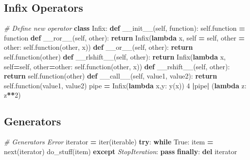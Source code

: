 \documentclass[]{book}
\newenvironment{Shaded}{\begin{snugshade}}{\end{snugshade}}
\newcommand{\KeywordTok}[1]{\textcolor[rgb]{0.13,0.29,0.53}{\textbf{#1}}}
\newcommand{\DecValTok}[1]{\textcolor[rgb]{0.00,0.00,0.81}{#1}}
\newcommand{\CommentTok}[1]{\textcolor[rgb]{0.56,0.35,0.01}{\textit{#1}}}
\newcommand{\FunctionTok}[1]{\textcolor[rgb]{0.00,0.00,0.00}{#1}}
\newcommand{\VariableTok}[1]{\textcolor[rgb]{0.00,0.00,0.00}{#1}}
\newcommand{\ControlFlowTok}[1]{\textcolor[rgb]{0.13,0.29,0.53}{\textbf{#1}}}
\newcommand{\OperatorTok}[1]{\textcolor[rgb]{0.81,0.36,0.00}{\textbf{#1}}}
\newcommand{\BuiltInTok}[1]{#1}
\newcommand{\PreprocessorTok}[1]{\textcolor[rgb]{0.56,0.35,0.01}{\textit{#1}}}
\newcommand{\NormalTok}[1]{#1}
\theoremstyle{definition}
\theoremstyle{definition}
\theoremstyle{definition}
\theoremstyle{remark}
\begin{document}
\subsection{Infix Operators}\label{infix-operators}

\begin{Shaded}
\begin{Highlighting}[]
\CommentTok{# Define new operator}
\KeywordTok{class}\NormalTok{ Infix:}
    \KeywordTok{def} \FunctionTok{__init__}\NormalTok{(}\VariableTok{self}\NormalTok{, function):}
        \VariableTok{self}\NormalTok{.function }\OperatorTok{=}\NormalTok{ function}
    \KeywordTok{def} \FunctionTok{__ror__}\NormalTok{(}\VariableTok{self}\NormalTok{, other):}
        \ControlFlowTok{return}\NormalTok{ Infix(}\KeywordTok{lambda}\NormalTok{ x, }\VariableTok{self} \OperatorTok{=} \VariableTok{self}\NormalTok{, other }\OperatorTok{=}\NormalTok{ other: }\VariableTok{self}\NormalTok{.function(other, x))}
    \KeywordTok{def} \FunctionTok{__or__}\NormalTok{(}\VariableTok{self}\NormalTok{, other):}
        \ControlFlowTok{return} \VariableTok{self}\NormalTok{.function(other)}
    \KeywordTok{def} \FunctionTok{__rlshift__}\NormalTok{(}\VariableTok{self}\NormalTok{, other):}
        \ControlFlowTok{return}\NormalTok{ Infix(}\KeywordTok{lambda}\NormalTok{ x, }\VariableTok{self}\OperatorTok{=}\VariableTok{self}\NormalTok{, other}\OperatorTok{=}\NormalTok{other: }\VariableTok{self}\NormalTok{.function(other, x))}
    \KeywordTok{def} \FunctionTok{__rshift__}\NormalTok{(}\VariableTok{self}\NormalTok{, other):}
        \ControlFlowTok{return} \VariableTok{self}\NormalTok{.function(other)}
    \KeywordTok{def} \FunctionTok{__call__}\NormalTok{(}\VariableTok{self}\NormalTok{, value1, value2):}
        \ControlFlowTok{return} \VariableTok{self}\NormalTok{.function(value1, value2)}
\NormalTok{pipe }\OperatorTok{=}\NormalTok{ Infix(}\KeywordTok{lambda}\NormalTok{ x,y: y(x))}
\DecValTok{4} \OperatorTok{|}\NormalTok{pipe}\OperatorTok{|}\NormalTok{ (}\KeywordTok{lambda}\NormalTok{ z: z}\OperatorTok{**}\DecValTok{2}\NormalTok{)}
\end{Highlighting}
\end{Shaded}

\subsection{Generators}\label{generators}

\begin{Shaded}
\begin{Highlighting}[]
\CommentTok{# Generators Error}
\NormalTok{iterator }\OperatorTok{=} \BuiltInTok{iter}\NormalTok{(iterable)}
\ControlFlowTok{try}\NormalTok{:}
    \ControlFlowTok{while} \VariableTok{True}\NormalTok{:}
\NormalTok{        item }\OperatorTok{=} \BuiltInTok{next}\NormalTok{(iterator)}
\NormalTok{        do_stuff(item)}
\ControlFlowTok{except} \PreprocessorTok{StopIteration}\NormalTok{:}
    \ControlFlowTok{pass}
\ControlFlowTok{finally}\NormalTok{:}
    \KeywordTok{del}\NormalTok{ iterator}
\end{Highlighting}
\end{Shaded}
\end{document}
